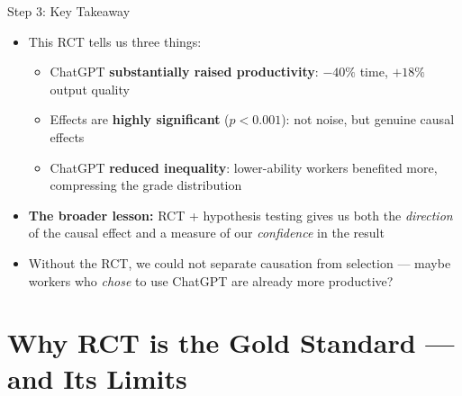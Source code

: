 \documentclass[hyperref={pdfpagelabels=false}]{beamer}
\begin{document}
	\begin{frame}{Step 3: Key Takeaway}
		\begin{itemize}
			\item This RCT tells us three things:
			\vspace{0.3cm}
			\begin{itemize}
				\item[1] ChatGPT \textbf{substantially raised productivity}: $-40\%$ time, $+18\%$ output quality
				\vspace{0.3cm}
				\item[2] Effects are \textbf{highly significant} ($p < 0.001$): not noise, but genuine causal effects
				\vspace{0.3cm}
				\item[3] ChatGPT \textbf{reduced inequality}: lower-ability workers benefited more, compressing the grade distribution
			\end{itemize}
			\vspace{0.4cm}
			\item \textbf{The broader lesson:} RCT + hypothesis testing gives us both the \emph{direction} of the causal effect and a measure of our \emph{confidence} in the result
			\vspace{0.3cm}
			\item Without the RCT, we could not separate causation from selection --- maybe workers who \emph{chose} to use ChatGPT are already more productive?
		\end{itemize}
	\end{frame}
	
	\section{Why RCT is the Gold Standard --- and Its Limits}
	
\end{document}
